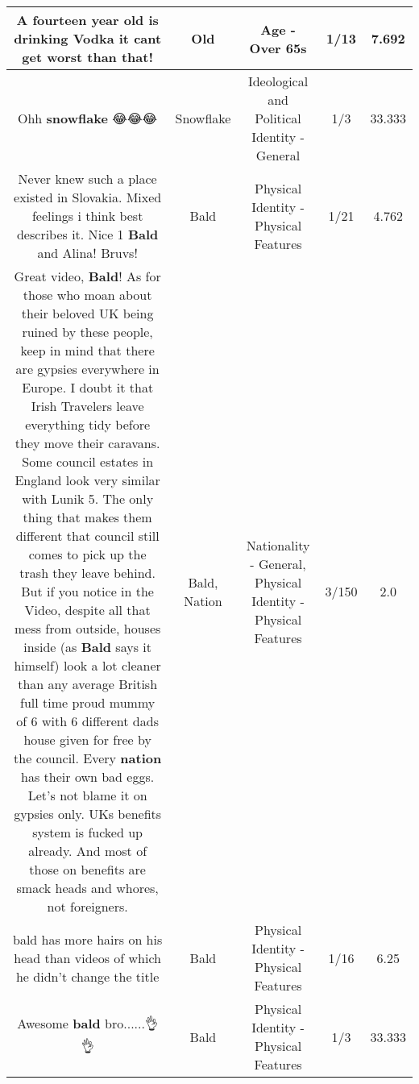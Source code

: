 \documentclass[11pt]{article}
\newlength\mylength
\begin{document}
\begin{center}
\begin{longtable}{|C{.65\mylength}|C{.30\mylength}|C{.12\mylength}|C{.12\mylength}|C{.12\mylength}|}
  \small A fourteen year \textbf{old} is drinking Vodka it cant get worst than that!\normalsize   & Old & Age - Over 65s & 1/13 & 7.692 \\  \hline
  \small Ohh \textbf{snowflake} 😂😂😂\normalsize   & Snowflake &  Ideological and Political Identity - General & 1/3 & 33.333 \\  \hline
  \small Never knew such a place existed in Slovakia. Mixed feelings i think best describes it. Nice 1 \textbf{Bald} and Alina! Bruvs!\normalsize   & Bald & Physical Identity - Physical Features & 1/21 & 4.762 \\  \hline
  \small Great video, \textbf{Bald}! As for those who moan about their beloved UK being ruined by these people, keep in mind that there are gypsies everywhere in Europe. I doubt it that Irish Travelers leave everything tidy before they move their caravans. Some council estates in England look very similar with Lunik 5. The only thing that makes them different that council still comes to pick up the trash they leave behind. But if you notice in the Video, despite all that mess from outside, houses inside (as \textbf{Bald} says it himself) look a lot cleaner than any average British full time proud mummy of 6 with 6 different dads house given for free by the council. Every \textbf{nation} has their own bad eggs. Let's not blame it on gypsies only. UKs benefits system is fucked up already. And most of those on benefits are smack heads and whores, not foreigners.\normalsize   & Bald, Nation & Nationality - General, Physical Identity - Physical Features & 3/150 & 2.0 \\  \hline
  \small bald has more hairs on his head than videos of which he didn't change the title\normalsize   & Bald & Physical Identity - Physical Features & 1/16 & 6.25 \\  \hline
  \small Awesome \textbf{bald} bro......👌👌\normalsize   & Bald & Physical Identity - Physical Features & 1/3 & 33.333 \\  \hline

\end{longtable}
\end{center}
\end{document}
